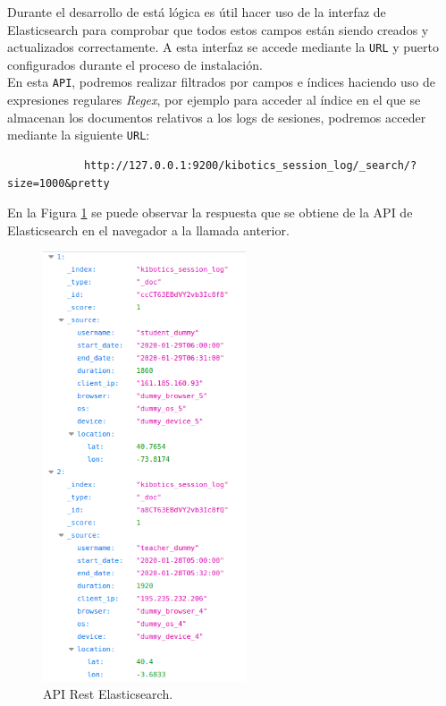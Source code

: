 \documentclass[a4paper, 12pt]{book}
\begin{document}
		Durante el desarrollo de está lógica es útil hacer uso de la interfaz de Elasticsearch para comprobar que todos estos campos están siendo creados y actualizados correctamente. A esta interfaz se accede mediante la \texttt{URL} y puerto configurados durante el proceso de instalación.\\
		
		En esta \texttt{API}, podremos realizar filtrados por campos e índices haciendo uso de expresiones regulares \textit{Regex}, por ejemplo para acceder al índice en el que se almacenan los documentos relativos a los logs de sesiones, podremos acceder mediante la siguiente \texttt{URL}:
		
		{\footnotesize
		\begin{verbatim}
			http://127.0.0.1:9200/kibotics_session_log/_search/?size=1000&pretty
		\end{verbatim}
		}
	
		En la Figura \ref{fig:api_elasticsearch} se puede observar la respuesta que se obtiene de la API de Elasticsearch en el navegador a la llamada anterior.
		
		\begin{figure}[H]
			\centering
			\includegraphics[width=6cm, keepaspectratio]{img/api_elasticsearch.png}
			\caption{API Rest Elasticsearch.}
			\label{fig:api_elasticsearch}
		\end{figure}
		
\end{document}

